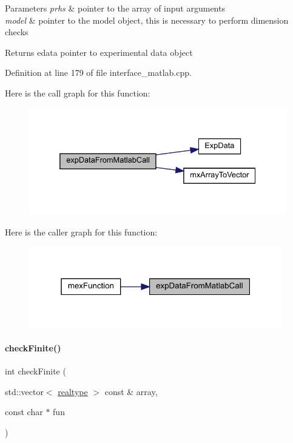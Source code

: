 \begin{DoxyParams}{Parameters}
{\em prhs} & pointer to the array of input arguments \\
\hline
{\em model} & pointer to the model object, this is necessary to perform dimension checks \\
\hline
\end{DoxyParams}
\begin{DoxyReturn}{Returns}
edata pointer to experimental data object 
\end{DoxyReturn}


Definition at line 179 of file interface\+\_\+matlab.\+cpp.

Here is the call graph for this function\+:
\nopagebreak
\begin{figure}[H]
\begin{center}
\leavevmode
\includegraphics[width=332pt]{namespaceamici_a186dd3debfe185669f305464f161e4bb_cgraph}
\end{center}
\end{figure}
Here is the caller graph for this function\+:
\nopagebreak
\begin{figure}[H]
\begin{center}
\leavevmode
\includegraphics[width=313pt]{namespaceamici_a186dd3debfe185669f305464f161e4bb_icgraph}
\end{center}
\end{figure}
\mbox{\label{namespaceamici_a1c2cd160b1b5061e19257f2a7947c8ed}} 
\paragraph{\texorpdfstring{checkFinite()}{checkFinite()}\hspace{0.1cm}{\footnotesize\ttfamily [1/2]}}
{\footnotesize\ttfamily int check\+Finite (\begin{DoxyParamCaption}\item[{std\+::vector$<$ \mbox{\hyperlink{namespaceamici_a1bdce28051d6a53868f7ccbf5f2c14a3}{realtype}} $>$ const \&}]{array,  }\item[{const char $\ast$}]{fun }\end{DoxyParamCaption})}

